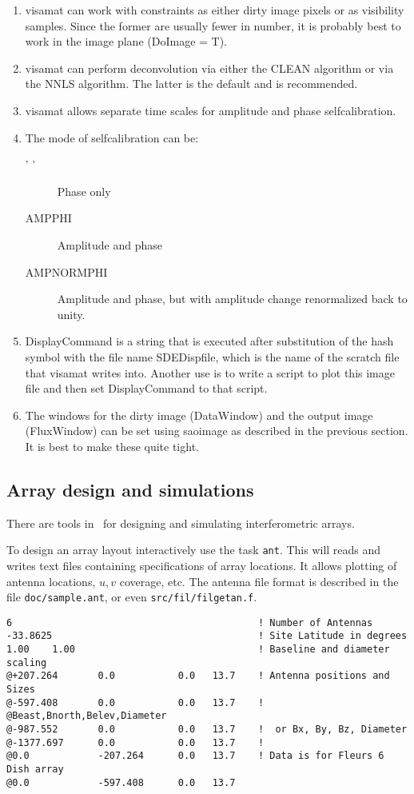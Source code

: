 \begin{enumerate}
\item visamat can work with constraints as either dirty image
pixels or as visibility samples. Since the former are usually fewer in
number, it is probably best to work in the image plane (DoImage = T).
\item visamat can perform deconvolution via either the CLEAN algorithm
or via the NNLS algorithm. The latter is the default and is recommended.
\item visamat allows separate time scales for amplitude and phase
selfcalibration.
\item The mode of selfcalibration can be:
\begin{description}
\item[' '] Phase only
\item[AMPPHI] Amplitude and phase
\item[AMPNORMPHI] Amplitude and phase, but with amplitude change
renormalized back to unity.
\end{description}
\item  DisplayCommand is a string that is executed after substitution
of the hash symbol with the file name SDEDispfile, which is the name
of the scratch file that visamat writes into. Another use is to write
a script to plot this image file and then set DisplayCommand to that
script.
\item The windows for the dirty image (DataWindow) and the output
image (FluxWindow) can be set using saoimage as described in the 
previous section. It is best to make these quite tight.
\end{enumerate}

\subsection{Array design and simulations}

There are tools in \sde\ for designing and simulating interferometric
arrays.

To design an array layout interactively use the task {\tt ant}. This
will reads and writes text files containing specifications of
array locations. It allows plotting of antenna locations, $u,v$ coverage,
etc. The antenna file format is described in the file {\tt doc/sample.ant},
or even {\tt src/fil/filgetan.f}.

\begin{verbatim}
6                                           ! Number of Antennas
-33.8625                                    ! Site Latitude in degrees
1.00    1.00                                ! Baseline and diameter scaling
@+207.264       0.0           0.0   13.7    ! Antenna positions and Sizes
@-597.408       0.0           0.0   13.7    !  @Beast,Bnorth,Belev,Diameter
@-987.552       0.0           0.0   13.7    !  or Bx, By, Bz, Diameter
@-1377.697      0.0           0.0   13.7    !
@0.0            -207.264      0.0   13.7    ! Data is for Fleurs 6 Dish array
@0.0            -597.408      0.0   13.7
\end{verbatim}


